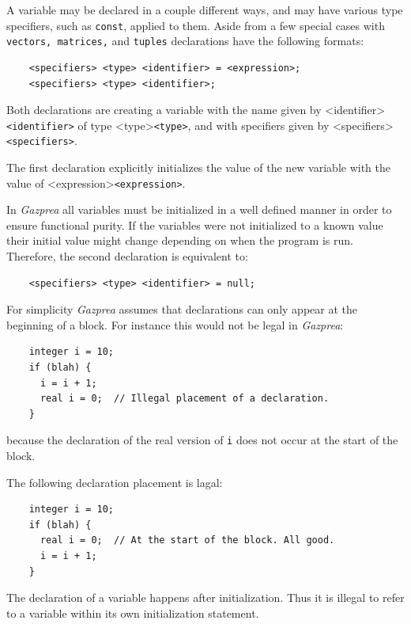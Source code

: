 \documentclass{article}
\begin{document}
  A variable may be declared in a couple different ways, and may have various type specifiers, such as \texttt{const},
  applied to them. Aside from a few special cases with \texttt{vectors, matrices,} and \texttt{tuples} declarations
  have the following formats:

  \begin{lstlisting}
    <specifiers> <type> <identifier> = <expression>;
    <specifiers> <type> <identifier>;
  \end{lstlisting}

  Both declarations are creating a variable with the name given by <identifier>\texttt{<identifier>} of type
  <type>\texttt{<type>}, and with specifiers given by <specifiers>\texttt{<specifiers>}.

  The first declaration explicitly initializes the value of the new variable with the value of
  <expression>\texttt{<expression>}.

  In \textit{Gazprea} all variables must be initialized in a well defined manner in order to ensure functional purity.
  If the variables were not initialized to a known value their initial value might change depending on when the
  program is run.  Therefore, the second declaration is equivalent to:

  \begin{lstlisting}
    <specifiers> <type> <identifier> = null;
  \end{lstlisting}

  For simplicity \textit{Gazprea} assumes that declarations can only appear at the beginning of a block. For instance
  this would not be legal in \textit{Gazprea}:

  \begin{lstlisting}
    integer i = 10;
    if (blah) {
      i = i + 1;
      real i = 0;  // Illegal placement of a declaration.
    }
  \end{lstlisting}

  because the declaration of the real version of \texttt{i} does not occur at the start of the block.

  The following declaration placement is lagal:

  \begin{lstlisting}
    integer i = 10;
    if (blah) {
      real i = 0;  // At the start of the block. All good.
      i = i + 1;
    }
  \end{lstlisting}

  The declaration of a variable happens after initialization. Thus it is illegal to refer to a variable within its own
  initialization statement.
\end{document}

